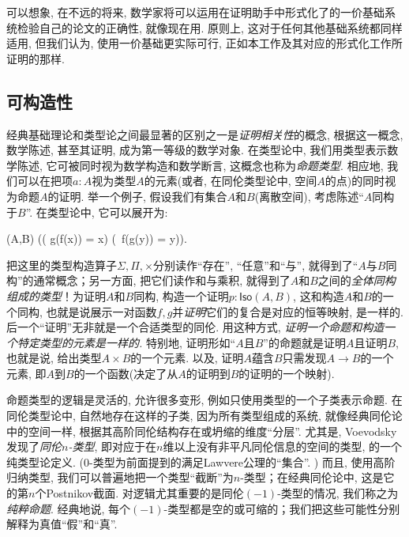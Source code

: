 可以想象, 在不远的将来, 数学家将可以运用在证明助手中形式化了的一价基础系统检验自己的论文的正确性, 就像现在用. 
原则上, 这对于任何其他基础系统都同样适用, 但我们认为, 使用一价基础更实际可行, 正如本工作及其对应的形式化工作所证明的那样. 

%
%
%
%

\subsection*{可构造性} 

%

经典基础理论和类型论之间最显著的区别之一是\emph{证明相关性}的概念, 根据这一概念, 数学陈述, 甚至其证明, 成为第一等级的数学对象. 
在类型论中, 我们用类型表示数学陈述, 它可被同时视为数学构造和数学断言, 这概念也称为\emph{命题类型}. 
%
相应地, 我们可以在把项$a : A$视为类型$A$的元素(或者, 在同伦类型论中, 空间$A$的点)的同时视为命题$A$的证明. 
举一个例子, 假设我们有集合$A$和$B$(离散空间), 
%
考虑陈述``$A$同构于$B$''. 在类型论中, 它可以展开为: 
\begin{narrowmultline*}
  (A,B)  \narrowbreak
  \Big(\big( g(f(x)) = x\big) \times \big(\, f(g(y)) = y\big)\Big).
\end{narrowmultline*}
%
把这里的类型构造算子$\Sigma, \Pi, \times$分别读作``存在'', ``任意''和``与'', 就得到了``$A$与$B$同构''的通常概念；另一方面, 把它们读作和与乘积, 就得到了$A$和$B$之间的\emph{全体同构组成的类型}！为证明$A$和$B$同构, 构造一个证明$p : \mathsf{Iso}(A,B)$, 这和构造$A$和$B$的一个同构, 也就是说展示一对函数$f, g$并\emph{证明}它们的复合是对应的恒等映射, 是一样的. 后一个``证明''无非就是一个合适类型的同伦. 用这种方式, \emph{证明一个命题和构造一个特定类型的元素是一样的. }
特别地, 证明形如``$A$且$B$''的命题就是证明$A$且证明$B$, 也就是说, 给出类型$A\times B$的一个元素. 
以及, 证明$A$蕴含$B$只需发现$A \to B$的一个元素, 即$A$到$B$的一个函数(决定了从$A$的证明到$B$的证明的一个映射). 

命题类型的逻辑是灵活的, 允许很多变形, 例如只使用类型的一个子类表示命题. 
在同伦类型论中, 自然地存在这样的子类, 因为所有类型组成的系统, 就像经典同伦论中的空间一样, 根据其高阶同伦结构存在或坍缩的维度``分层''. 
尤其是, Voevodsky发现了\emph{同伦$n$-类型}, 即对应于在$n$维以上没有非平凡同伦信息的空间的类型, 的一个纯类型论定义. 
($0$-类型为前面提到的满足Lawvere公理的``集合''. )
而且, 使用高阶归纳类型, 我们可以普遍地把一个类型``截断''为$n$-类型；在经典同伦论中, 这是它的第$n$个Postnikov截面. 
对逻辑尤其重要的是同伦$(-1)$-类型的情况, 我们称之为\emph{纯粹命题}. 
经典地说, 每个$(-1)$-类型都是空的或可缩的；我们把这些可能性分别解释为真值``假''和``真''. 

